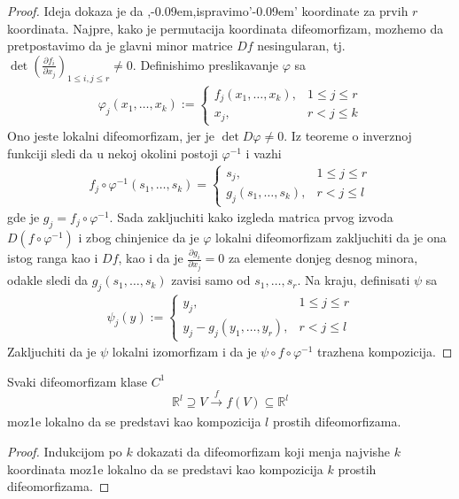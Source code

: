 \documentclass[a4paper,12pt]{article}
\newcommand{\R}{\mathbb{R}}
\def\zn{,\kern-0.09em,} %
\def\zng{'\kern-0.09em' } %
\begin{document}
\begin{proof}
	Ideja dokaza je da \zn ispravimo\zng koordinate za prvih $r$ koordinata.
	Najpre, kako je permutacija koordinata difeomorfizam, mozhemo da pretpostavimo da je 
	glavni minor matrice $Df$ nesingularan, tj. $\det \left( \frac{\partial f_i}{\partial x_j}\right)_{1\leq i, j \leq r} \neq 0$.
	Definishimo preslikavanje $\varphi$ sa 
	\begin{align*}
		\varphi_j (x_1, \dotso, x_k):= 
		\begin{cases}
			f_j(x_1, \dotso, x_k), &1\leq j \leq r \\
			x_j, &r<j\leq k
		\end{cases}
	\end{align*}
	Ono jeste lokalni difeomorfizam, jer je $\det D\varphi \neq 0$. Iz teoreme o inverznoj funkciji sledi da u nekoj okolini
	postoji $\varphi^{-1}$ i vazhi 
	\begin{align*}
		f_j\circ \varphi^{-1}(s_1,\dotso, s_k) = 
		\begin{cases}
			s_j, &1 \leq j \leq r \\ 
			g_j(s_1, \dotso , s_k), &r < j \leq l
		\end{cases}
	\end{align*}
	gde je $g_j = f_j \circ \varphi^{-1}$.
	Sada zakljuchiti kako izgleda matrica prvog izvoda $D(f\circ \varphi^{-1})$ i zbog chinjenice da je $\varphi$ lokalni
	difeomorfizam zakljuchiti da je ona istog ranga kao i $Df$, kao i da je $\frac{\partial g_i}{\partial x_j}= 0$ za 
	elemente donjeg desnog minora,
	odakle sledi da $g_j(s_1, \dotso , s_k)$ zavisi samo od $s_1,\dotso, s_r$. Na kraju, definisati $\psi$ sa 
	\begin{align*}
		\psi_j (y):= 
		\begin{cases}
			y_j, &1\leq j \leq r \\
			y_j - g_j(y_1,\dotso, y_r), &r<j\leq l
		\end{cases}
	\end{align*}
	Zakljuchiti da je $\psi$ lokalni izomorfizam i da je $\psi\circ f\circ \varphi^{-1}$ trazhena kompozicija.

\end{proof}
\begin{tvr}
Svaki difeomorfizam klase $C^1$ 
\[\R^l \supseteq V \xrightarrow[]{f} f(V) \subseteq \R^l \]
moz1e lokalno da se predstavi kao kompozicija $l$ prostih difeomorfizama. 
\end{tvr}
\begin{proof}
Indukcijom po $k$ dokazati da difeomorfizam koji menja najvishe $k$ koordinata moz1e lokalno da se predstavi kao kompozicija $k$ prostih difeomorfizama.
\end{proof}
\end{document}
